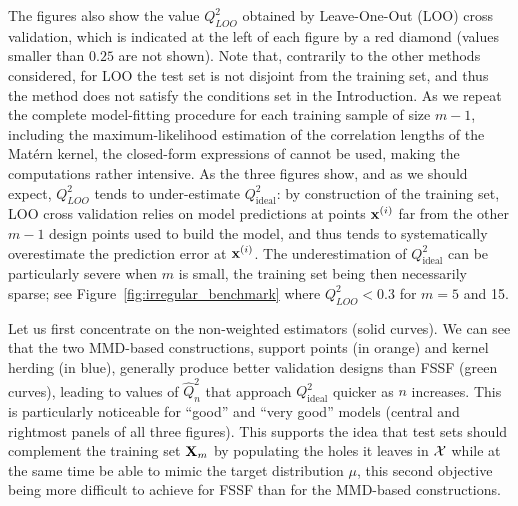 The figures also show the value $Q^2_{LOO}$ obtained by Leave-One-Out (LOO) cross validation, which is indicated at the left of each figure  by a red  diamond (values smaller than $0.25$ are not shown). 
Note that, contrarily to the other methods considered, for LOO the test set  is not disjoint from the training set, and thus the method does not satisfy the conditions set in the Introduction. As we repeat the complete model-fitting procedure for each training sample of size $m-1$, including the maximum-likelihood estimation of the correlation lengths of the Matérn kernel, the closed-form expressions of \cite{Dubrule83} cannot be used, making the computations rather intensive. 
As the three figures show, and as we should expect, $Q_{LOO}^2$ tends to under-estimate $Q_{\mathrm{ideal}}^2$:  by construction of the training set, LOO cross validation relies on  model predictions at points ${\bf x}^{(i)}$ far from the other $m-1$ design points used to build the model, and thus tends to systematically overestimate the prediction error at ${\bf x}^{(i)}$. The underestimation of $Q_{\mathrm{ideal}}^2$ can be particularly severe when $m$ is small, the training set being then necessarily sparse; see Figure~\ref{fig:irregular_benchmark} where $Q_{LOO}^2<0.3$ for $m=5$ and 15. 

Let us first concentrate on the non-weighted estimators (solid curves).
 We can see that the two MMD-based constructions,  support points (in orange) and kernel herding (in blue), generally produce better validation designs than FSSF (green curves), leading to values of $\widehat Q^2_n$ that approach $Q_{\mathrm{ideal}}^2$ quicker as $n$ increases. This is particularly noticeable for ``good'' and ``very good'' models (central and rightmost panels of all three figures).
This supports the idea that test sets should complement the training set ${\bf X}_m$ by populating the holes it leaves in $\mathcal{X}$ while at the same time be able to mimic the target distribution $\mu$, this second objective being more difficult to achieve for FSSF than for the MMD-based constructions. 


